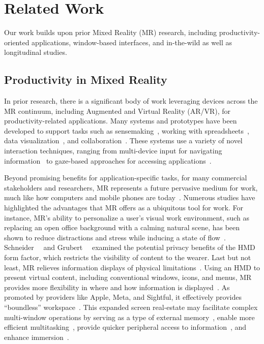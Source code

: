 \section{Related Work}
\label{sec:related-work}
Our work builds upon prior Mixed Reality (MR) research, including productivity-oriented applications, window-based interfaces, and in-the-wild as well as longitudinal studies.

\subsection{Productivity in Mixed Reality}
\label{sec:related-work-productivity}
In prior research, there is a significant body of work leveraging devices across the MR continuum, including Augmented and Virtual Reality (AR/VR), for productivity-related applications.
Many systems and prototypes have been developed to support tasks such as sensemaking~\cite{lisle2021immersivethink}, 
working with spreadsheets~\cite{gesslein2020spreadsheet},
data visualization~\cite{butscher2018collaborativeanalysis},
and collaboration~\cite{pejsa2016room2room}.
These systems use a variety of novel interaction techniques, 
ranging from multi-device input for navigating information~\cite{le2021vxslate,biener2020breakingscreen} to gaze-based approaches for accessing applications~\cite{lu2020glanceable}. 

Beyond promising benefits for application-specific tasks, for many commercial stakeholders and researchers, MR represents a future pervasive medium for work, much like how computers and mobile phones are today~\cite{gruber2018officefuture,grubert2017pervasive,feiner2002ar}.
Numerous studies have highlighted the advantages that MR offers as a ubiquitous tool for work.
For instance, MR's ability to personalize a user's visual work environment, such as replacing an open office background with a calming natural scene, has been shown to reduce distractions and stress while inducing a state of flow~\cite{ruvimova2020transportaway,lee2022partitioning,thoondee2017vrstress}. Schneider~\etal~\cite{reconviguration2019schneider} and Grubert~\etal~\cite{gruber2018officefuture} examined the potential privacy benefits of the HMD form factor, which restricts the visibility of content to the wearer.
Last but not least, MR relieves information displays of physical limitations~\cite{biener2022vrweek,gruber2018officefuture}. 
Using an HMD to present virtual content, including conventional windows, icons, and menus, MR provides more flexibility in where and how information is displayed~\cite{pavanatto2024xrwild}. 
As promoted by providers like Apple, Meta, and Sightful, it effectively provides ``boundless'' workspace~\cite{sightful}. 
This expanded screen real-estate may facilitate
complex multi-window operations by serving as a type of external memory~\cite{pavanatto2024multiplemonitors,andrews2010space,ball2007movetoimprove}, 
enable more efficient multitasking~\cite{czerwinski2003largedisplays},
provide quicker peripheral access to information~\cite{lu2020glanceable,davari2020occlusion,grudin2001digitalworlds}, 
and enhance immersion~\cite{endert2012lhrd}.


